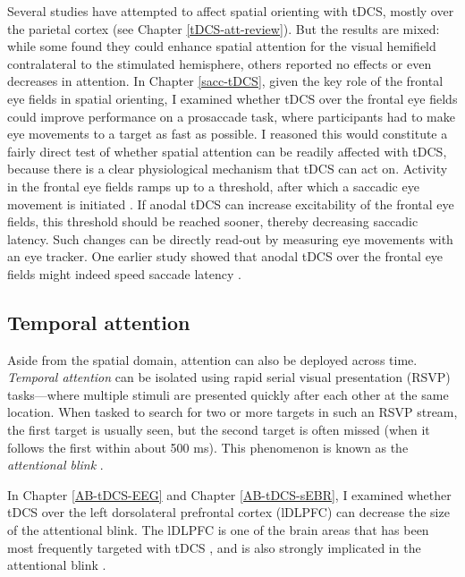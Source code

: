 \documentclass[11pt,]{memoir}
\begin{document}
Several studies have attempted to affect spatial orienting with tDCS, mostly over the parietal cortex (see Chapter \ref{tDCS-att-review}). But the results are mixed: while some found they could enhance spatial attention for the visual hemifield contralateral to the stimulated hemisphere, others reported no effects or even decreases in attention. In Chapter \ref{sacc-tDCS}, given the key role of the frontal eye fields in spatial orienting, I examined whether tDCS over the frontal eye fields could improve performance on a prosaccade task, where participants had to make eye movements to a target as fast as possible. I reasoned this would constitute a fairly direct test of whether spatial attention can be readily affected with tDCS, because there is a clear physiological mechanism that tDCS can act on. Activity in the frontal eye fields ramps up to a threshold, after which a saccadic eye movement is initiated \autocite{Hanes1996}. If anodal tDCS can increase excitability of the frontal eye fields, this threshold should be reached sooner, thereby decreasing saccadic latency. Such changes can be directly read-out by measuring eye movements with an eye tracker. One earlier study showed that anodal tDCS over the frontal eye fields might indeed speed saccade latency \autocites{Kanai2012}[but see][]{Chen2017}.

\hypertarget{temporal-attention}{%
\subsection{Temporal attention}\label{temporal-attention}}

Aside from the spatial domain, attention can also be deployed across time. \emph{Temporal attention} can be isolated using rapid serial visual presentation (RSVP) tasks---where multiple stimuli are presented quickly after each other at the same location. When tasked to search for two or more targets in such an RSVP stream, the first target is usually seen, but the second target is often missed (when it follows the first within about 500 ms). This phenomenon is known as the \emph{attentional blink} \autocite{Raymond1992}.

In Chapter \ref{AB-tDCS-EEG} and Chapter \ref{AB-tDCS-sEBR}, I examined whether tDCS over the left dorsolateral prefrontal cortex (lDLPFC) can decrease the size of the attentional blink. The lDLPFC is one of the brain areas that has been most frequently targeted with tDCS \autocite{Santarnecchi2015}, and is also strongly implicated in the attentional blink \autocites{Hommel2006}{Slagter2010}.
\end{document}
